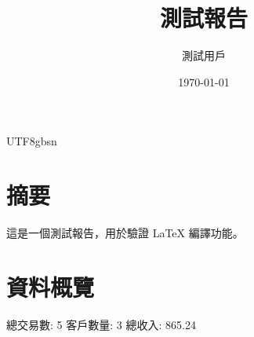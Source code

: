 \documentclass{article}
\begin{document}
\begin{CJK*}{UTF8}{gbsn}
\title{測試報告}
\author{測試用戶}
\date{\today}
\maketitle
\section{摘要}
這是一個測試報告，用於驗證 LaTeX 編譯功能。
\section{資料概覽}
總交易數: 5
客戶數量: 3
總收入: 865.24
\end{CJK*}
\end{document}
